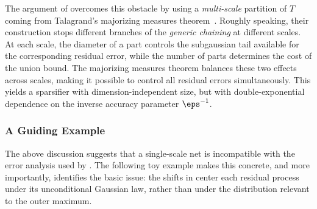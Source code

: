 \documentclass[11pt]{article}
\begin{document}
The argument of \cite{de2026sparsifying} overcomes this obstacle by using a \emph{multi-scale} partition of $T$ coming from Talagrand's majorizing measures theorem~\cite[Theorem~2.10.1]{talagrand2022upper}. 
Roughly speaking, their construction stops different branches of the \emph{generic chaining} at different scales. 
At each scale, the diameter of a part controls the subgaussian tail available for the corresponding residual error, while the number of parts determines the cost of the union bound. 
The majorizing measures theorem balances these two effects across scales, making it possible to control all residual errors simultaneously. 
This yields a sparsifier with dimension-independent size, but with double-exponential dependence on the inverse accuracy parameter $\eps^{-1}$. 

\subsubsection{A Guiding Example}
\label{subsubsec:intro-example}

The above discussion suggests that a single-scale net is incompatible with the error analysis used by \cite{de2026sparsifying}. 
The following toy example makes this concrete, and more importantly, identifies the basic issue: the shifts in  center each residual process under its unconditional Gaussian law, rather than under the distribution relevant to the outer maximum. 
\end{document}
